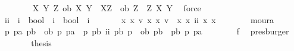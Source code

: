 \begin{isabellebody}
\ \ \ \ \ \ \isamarkupfalse%
\ {\isacartoucheopen}{\isasymforall}X\ Y\ Z{\isachardot}\ ob\ X\ Y\ {\isasymand}\ {\isacharparenleft}{\isasymTurnstile}{\isacharparenleft}X\isactrlbold {\isasymrightarrow}Z{\isacharparenright}{\isacharparenright}\ {\isasymlongrightarrow}\ ob\ Z\ {\isacharparenleft}\ {\isacharparenleft}Z\isactrlbold {\isasymand}{\isacharparenleft}\isactrlbold {\isasymnot}\ X{\isacharparenright}{\isacharparenright}\isactrlbold {\isasymor}\ Y{\isacharparenright}{\isacartoucheclose}\ \isamarkupfalse%
\ force\isanewline
\ \ \ \ \isamarkupfalse%
\ ii\ {\isacharcolon}{\isacharcolon}\ {\isachardoublequoteopen}{\isacharparenleft}i\ {\isasymRightarrow}\ bool{\isacharparenright}\ {\isasymRightarrow}\ {\isacharparenleft}i\ {\isasymRightarrow}\ bool{\isacharparenright}\ {\isasymRightarrow}\ i{\isachardoublequoteclose}\ \isanewline
\ \ \ \ \ \ {\isachardoublequoteopen}{\isasymforall}x{}\ x{}{\isachardot}\ {\isacharparenleft}{\isasymexists}v{}{\isachardot}\ {\isacharparenleft}x{}\isactrlbold {\isasymand}{\isacharparenleft}\isactrlbold {\isasymnot}\ x{}{\isacharparenright}{\isacharparenright}\ v{}{\isacharparenright}\ {\isacharequal}\ {\isacharparenleft}x{}\isactrlbold {\isasymand}{\isacharparenleft}\isactrlbold {\isasymnot}\ x{}{\isacharparenright}{\isacharparenright}\ {\isacharparenleft}ii\ x{}\ x{}{\isacharparenright}{\isachardoublequoteclose}\isanewline
\ \ \ \ \ \ \isamarkupfalse%
\ moura\isanewline
\ \ \ \ \isamarkupfalse%
\ \isamarkupfalse%
\ {\isachardoublequoteopen}{\isasymforall}p\ pa\ pb{\isachardot}\ {\isacharparenleft}{\isacharparenleft}{\isasymnot}\ ob\ p\ pa{\isacharparenright}\ {\isasymor}\ {\isacharparenleft}p\isactrlbold {\isasymand}{\isacharparenleft}\isactrlbold {\isasymnot}\ pb{\isacharparenright}{\isacharparenright}\ {\isacharparenleft}ii\ pb\ p{\isacharparenright}{\isacharparenright}\ {\isasymor}\ ob\ pb\ {\isacharparenleft}\ {\isacharparenleft}pb\isactrlbold {\isasymand}{\isacharparenleft}\isactrlbold {\isasymnot}\ p{\isacharparenright}{\isacharparenright}\isactrlbold {\isasymor}\ pa{\isacharparenright}{\isachardoublequoteclose}\isanewline
\ \ \ \ \ \ \isamarkupfalse%
\ f{}\ \isamarkupfalse%
\ presburger\isanewline
\ \ \ \ \isamarkupfalse%
\ \isamarkupfalse%
\ {\isacharquery}thesis\isanewline
\ \ \ \ \ \ \isamarkupfalse%

\end{isabellebody}
